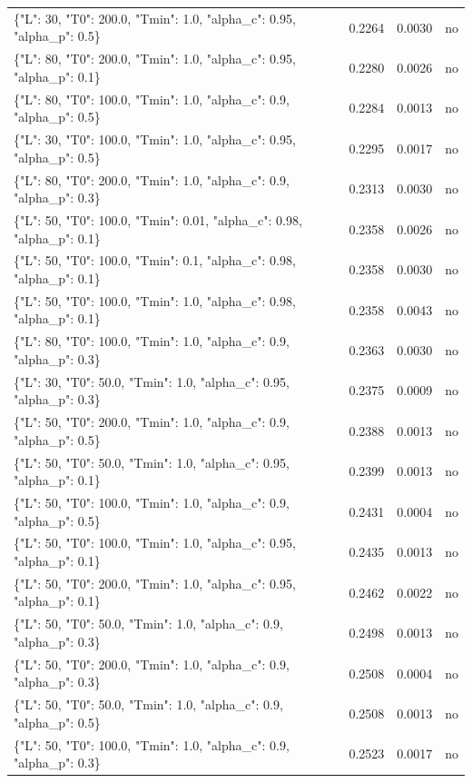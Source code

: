 \begin{table}[htbp]
\begin{tabular}{lrrr}
\{"L": 30, "T0": 200.0, "Tmin": 1.0, "alpha\_c": 0.95, "alpha\_p": 0.5\} & 0.2264 & 0.0030 & no \\
\{"L": 80, "T0": 200.0, "Tmin": 1.0, "alpha\_c": 0.95, "alpha\_p": 0.1\} & 0.2280 & 0.0026 & no \\
\{"L": 80, "T0": 100.0, "Tmin": 1.0, "alpha\_c": 0.9, "alpha\_p": 0.5\} & 0.2284 & 0.0013 & no \\
\{"L": 30, "T0": 100.0, "Tmin": 1.0, "alpha\_c": 0.95, "alpha\_p": 0.5\} & 0.2295 & 0.0017 & no \\
\{"L": 80, "T0": 200.0, "Tmin": 1.0, "alpha\_c": 0.9, "alpha\_p": 0.3\} & 0.2313 & 0.0030 & no \\
\{"L": 50, "T0": 100.0, "Tmin": 0.01, "alpha\_c": 0.98, "alpha\_p": 0.1\} & 0.2358 & 0.0026 & no \\
\{"L": 50, "T0": 100.0, "Tmin": 0.1, "alpha\_c": 0.98, "alpha\_p": 0.1\} & 0.2358 & 0.0030 & no \\
\{"L": 50, "T0": 100.0, "Tmin": 1.0, "alpha\_c": 0.98, "alpha\_p": 0.1\} & 0.2358 & 0.0043 & no \\
\{"L": 80, "T0": 100.0, "Tmin": 1.0, "alpha\_c": 0.9, "alpha\_p": 0.3\} & 0.2363 & 0.0030 & no \\
\{"L": 30, "T0": 50.0, "Tmin": 1.0, "alpha\_c": 0.95, "alpha\_p": 0.3\} & 0.2375 & 0.0009 & no \\
\{"L": 50, "T0": 200.0, "Tmin": 1.0, "alpha\_c": 0.9, "alpha\_p": 0.5\} & 0.2388 & 0.0013 & no \\
\{"L": 50, "T0": 50.0, "Tmin": 1.0, "alpha\_c": 0.95, "alpha\_p": 0.1\} & 0.2399 & 0.0013 & no \\
\{"L": 50, "T0": 100.0, "Tmin": 1.0, "alpha\_c": 0.9, "alpha\_p": 0.5\} & 0.2431 & 0.0004 & no \\
\{"L": 50, "T0": 100.0, "Tmin": 1.0, "alpha\_c": 0.95, "alpha\_p": 0.1\} & 0.2435 & 0.0013 & no \\
\{"L": 50, "T0": 200.0, "Tmin": 1.0, "alpha\_c": 0.95, "alpha\_p": 0.1\} & 0.2462 & 0.0022 & no \\
\{"L": 50, "T0": 50.0, "Tmin": 1.0, "alpha\_c": 0.9, "alpha\_p": 0.3\} & 0.2498 & 0.0013 & no \\
\{"L": 50, "T0": 200.0, "Tmin": 1.0, "alpha\_c": 0.9, "alpha\_p": 0.3\} & 0.2508 & 0.0004 & no \\
\{"L": 50, "T0": 50.0, "Tmin": 1.0, "alpha\_c": 0.9, "alpha\_p": 0.5\} & 0.2508 & 0.0013 & no \\
\{"L": 50, "T0": 100.0, "Tmin": 1.0, "alpha\_c": 0.9, "alpha\_p": 0.3\} & 0.2523 & 0.0017 & no \\

\end{tabular}
\end{table}
